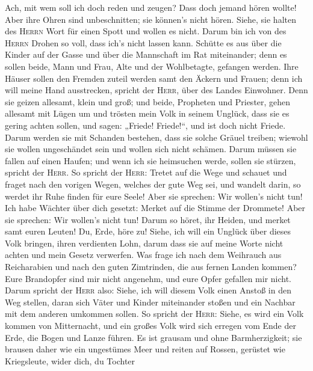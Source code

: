  Ach, mit wem soll ich doch reden und zeugen? Dass doch
jemand hören wollte! Aber ihre Ohren sind unbeschnitten; sie können's
nicht hören. Siehe, sie halten des \textsc{Herrn} Wort für einen Spott
und wollen es nicht.  Darum bin ich von des
\textsc{Herrn} Drohen so voll, dass ich's nicht lassen kann. Schütte es
aus über die Kinder auf der Gasse und über die Mannschaft im Rat
miteinander; denn es sollen beide, Mann und Frau, Alte und der
Wohlbetagte, gefangen werden.  Ihre Häuser sollen den
Fremden zuteil werden samt den Äckern und Frauen; denn ich will meine
Hand ausstrecken, spricht der \textsc{Herr}, über des Landes Einwohner.
 Denn sie geizen allesamt, klein und groß; und beide,
Propheten und Priester, gehen allesamt mit Lügen um  und
trösten mein Volk in seinem Unglück, dass sie es gering achten sollen,
und sagen: „Friede! Friede!{}``, und ist doch nicht Friede.
 Darum werden sie mit Schanden bestehen, dass sie solche
Gräuel treiben; wiewohl sie wollen ungeschändet sein und wollen sich
nicht schämen. Darum müssen sie fallen auf einen Haufen; und wenn ich
sie heimsuchen werde, sollen sie stürzen, spricht der \textsc{Herr}.
 So spricht der \textsc{Herr}: Tretet auf die Wege und
schauet und fraget nach den vorigen Wegen, welches der gute Weg sei, und
wandelt darin, so werdet ihr Ruhe finden für eure Seele! Aber sie
sprechen: Wir wollen's nicht tun!  Ich habe Wächter über
dich gesetzt: Merket auf die Stimme der Drommete! Aber sie sprechen: Wir
wollen's nicht tun!  Darum so höret, ihr Heiden, und
merket samt euren Leuten!  Du, Erde, höre zu! Siehe, ich
will ein Unglück über dieses Volk bringen, ihren verdienten Lohn, darum
dass sie auf meine Worte nicht achten und mein Gesetz verwerfen.
 Was frage ich nach dem Weihrauch aus Reicharabien und
nach den guten Zimtrinden, die aus fernen Landen kommen? Eure Brandopfer
sind mir nicht angenehm, und eure Opfer gefallen mir nicht.
 Darum spricht der \textsc{Herr} also: Siehe, ich will
diesem Volk einen Anstoß in den Weg stellen, daran sich Väter und Kinder
miteinander stoßen und ein Nachbar mit dem anderen umkommen sollen.
 So spricht der \textsc{Herr}: Siehe, es wird ein Volk
kommen von Mitternacht, und ein großes Volk wird sich erregen vom Ende
der Erde,  die Bogen und Lanze führen. Es ist grausam und
ohne Barmherzigkeit; sie brausen daher wie ein ungestümes Meer und
reiten auf Rossen, gerüstet wie Kriegsleute, wider dich, du Tochter
